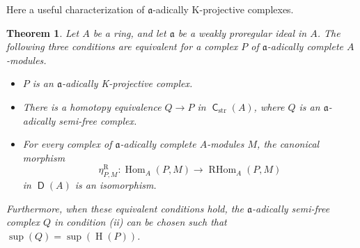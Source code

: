 \documentclass[10pt]{amsart}
\newtheorem{thm}[equation]{Theorem}
\theoremstyle{definition}
\numberwithin{equation}{section}
\newcommand{\opn}{\operatorname}
\newcommand{\cat}[1]{\operatorname{\mathsf{#1}}}
\newcommand{\rmitem}[1]{\item[\textrm{(#1)}]}
\newcommand{\mfrak}[1]{\mathfrak{#1}}
\newcommand{\mrm}[1]{\mathrm{#1}}
\renewcommand{\a}{\mfrak{a}}
\begin{document}
Here a useful characterization of $\a$-adically K-projective complexes.

\begin{thm} \label{thm:401}
Let $A$ be a ring, and let $\a$ be a weakly proregular ideal in $A$.
The following three conditions are equivalent for a complex $P$ of $\a$-adically
complete $A$-modules.
\begin{itemize}
\rmitem{i} $P$ is an $\a$-adically K-projective complex.

\rmitem{ii} There is a homotopy equivalence
$Q \to P$ in $\cat{C}_{\mrm{str}}(A)$, where $Q$ is an
$\a$-adically semi-free complex.

\rmitem{iii} For every complex of $\a$-adically complete $A$-modules $M$,
the canonical morphism
\[ \eta^{\mrm{R}}_{P, M} : \opn{Hom}_{A}(P, M) \to \opn{RHom}_{A}(P, M) \]
in $\cat{D}(A)$ is an isomorphism.
\end{itemize}
Furthermore, when these equivalent conditions hold, the $\a$-adically
semi-free complex $Q$ in condition {\rm (ii)} can be chosen such that
$\opn{sup}(Q) = \opn{sup}(\opn{H}(P))$.
\end{thm}
\end{document}
